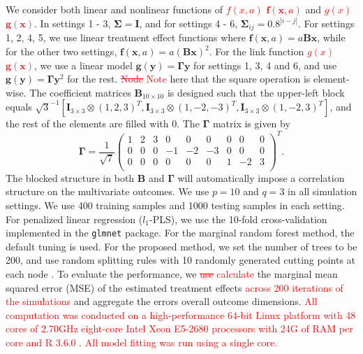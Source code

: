 \documentclass[smallextended]{svjour3}
\newcommand{\bg}[1]{\textcolor{red}{#1}}
\begin{document}
We consider both linear and nonlinear functions of \bg{\st{$f(x, a)$} $\bm f(\textbf{x}, a)$} and \bg{\st{$g(x)$} $\bm g(\textbf{x})$}. In settings 1 - 3, $\bm \Sigma = \bm I$, and for settings 4 - 6, $\bm \Sigma_{ij} = 0.8^{|i-j|}$. For settings 1, 2, 4, 5, we use linear treatment effect functions where $\bm f(\textbf{x}, a) = a\textbf{B}\textbf{x}$, while for the other two settings, $\bm f(\textbf{x}, a) = a(\textbf{B}\textbf{x})^2$. For the link function \bg{\st{$g(x)$} $\bm g(\textbf{x})$}, we use a linear model $\bm g(\textbf{y}) = \bm \Gamma\textbf{y}$ for settings 1, 3, 4 and 6, and use $\bm g(\textbf{y}) = \bm \Gamma\textbf{y}^2$ for the rest. \bg{\st{Node} Note} here that the square operation is element-wise. The coefficient matrices $\bm{B}_{10 \times 10}$ is designed such that the upper-left block equals $\sqrt{3}^{-1} [ \mathbf{I}_{3 \times 3}  \otimes (1,2,3)^T, \mathbf{I}_{3 \times 3} \otimes (1,-2,-3)^T, \mathbf{I}_{3 \times 3} \otimes (1,-2,3)^T ]$, and the rest of the elements are filled with 0. The $\bm \Gamma$ matrix is given by 
$$
  \bm \Gamma = \frac{1}{\sqrt{7}}
  \begin{pmatrix}{}
  1 & 2 & 3 & 0 & 0 & 0 & 0 & 0 & 0 \\
  0 & 0 & 0 & -1 & -2 & -3 & 0 & 0 & 0 \\
  0 & 0 & 0 & 0 & 0 & 0 & 1 & -2 & 3 \\
  \end{pmatrix}^T.
$$
The blocked structure in both $\bm B$ and $\bm \Gamma$ will automatically impose a correlation structure on the multivariate outcomes. We use $p=10$ and $q = 3$ in all simulation settings. We use 400 training samples and 1000 testing samples in each setting. For penalized linear regression ($l_1$-PLS), we use the 10-fold cross-validation implemented in the \texttt{glmnet} package. For the marginal random forest method, the default tuning is used. For the proposed method, we set the number of trees to be 200, and use random splitting rules with 10 randomly generated cutting points at each node \bg{\citep{geurts2006extremely}}. To evaluate the performance, we \bg{\st{use} calculate} the marginal mean squared error (MSE) of the estimated treatment effects \bg{across 200 iterations of the simulations} and aggregate the errors overall outcome dimensions. \bg{All computation was conducted on a high\bg{-}performance 64-bit Linux platform with 48 cores of 2.70GHz eight-core Intel Xeon E5-2680 processors with 24G of RAM per core and R 3.6.0 \citep{R2020}. All model fitting was run using a single core.}
\end{document}
